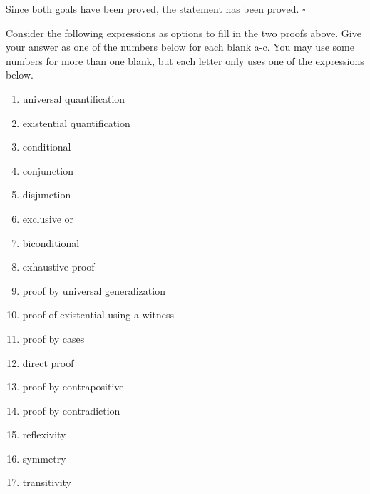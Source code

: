 \documentclass[12pt, oneside]{article}
\begin{document}
\begin{enumerate}
 Since both goals have been proved, the statement has been proved. $\square$
 
 
Consider the following expressions as options to fill in the two proofs above. Give your answer as one of the numbers below for each blank a-c. You may use some numbers for more than one blank, but each letter only uses one of the expressions below.

\begin{multicols}{2}
\begin{enumerate}[label=\roman*]
\item universal quantification
\item existential quantification
\item conditional
\item conjunction
\item disjunction
\item exclusive or
\item biconditional
\item exhaustive proof
\item proof by universal generalization
\item proof of existential using a witness
\item proof by cases
\item direct proof
\item proof by contrapositive
\item proof by contradiction
\item reflexivity
\item symmetry
\item transitivity
\end{enumerate}
\end{multicols}

\end{enumerate}
\end{document}
